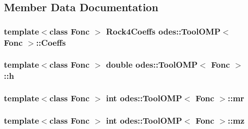 \subsection{Member Data Documentation}
\hypertarget{classodes_1_1ToolOMP_ad62a277a73cf51a49c1aa6cfac41e863}{
\subsubsection[{Coeffs}]{\setlength{\rightskip}{0pt plus 5cm}template$<$class Fonc $>$ {\bf Rock4\-Coeffs} {\bf odes\-::\-Tool\-O\-M\-P}$<$ Fonc $>$\-::Coeffs\hspace{0.3cm}{\ttfamily [private]}}}\label{classodes_1_1ToolOMP_ad62a277a73cf51a49c1aa6cfac41e863}
\hypertarget{classodes_1_1ToolOMP_a92423a40e96da1f9a7dba2d23b1c5d8b}{
\subsubsection[{h}]{\setlength{\rightskip}{0pt plus 5cm}template$<$class Fonc $>$ double {\bf odes\-::\-Tool\-O\-M\-P}$<$ Fonc $>$\-::h\hspace{0.3cm}{\ttfamily [private]}}}\label{classodes_1_1ToolOMP_a92423a40e96da1f9a7dba2d23b1c5d8b}
\hypertarget{classodes_1_1ToolOMP_a180f1b861084da81f226c7269842c217}{
\subsubsection[{mr}]{\setlength{\rightskip}{0pt plus 5cm}template$<$class Fonc $>$ int {\bf odes\-::\-Tool\-O\-M\-P}$<$ Fonc $>$\-::mr\hspace{0.3cm}{\ttfamily [private]}}}\label{classodes_1_1ToolOMP_a180f1b861084da81f226c7269842c217}
\hypertarget{classodes_1_1ToolOMP_af3db3c17d4cfe49f75e991dc1ccf86a5}{
\subsubsection[{mz}]{\setlength{\rightskip}{0pt plus 5cm}template$<$class Fonc $>$ int {\bf odes\-::\-Tool\-O\-M\-P}$<$ Fonc $>$\-::mz\hspace{0.3cm}{\ttfamily [private]}}}\label{classodes_1_1ToolOMP_af3db3c17d4cfe49f75e991dc1ccf86a5}
